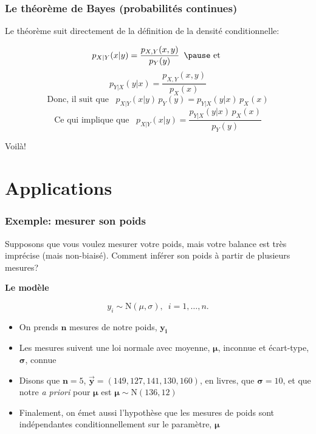 \documentclass{beamer}
\begin{document}
\begin{frame}
    \frametitle{Le théorème de Bayes (probabilités continues)}
    Le théorème suit directement de la définition de la densité conditionnelle:

    \pause

    \[p_{X|Y}(x|y) = \frac{p_{X,Y}(x,y)}{p_Y(y)} \,\,\, \pause \textrm{ et }\]
    \[p_{Y|X}(y|x) = \frac{p_{X,Y}(x,y)}{p_X(x)}\]
    \pause
    \[\textrm{Donc, il suit que } \,\,\, p_{X|Y}(x|y) \, p_Y(y) = p_{Y|X}(y|x) \, p_X(x)\]
    \pause
    \[\textrm{Ce qui implique que } \,\,\, p_{X|Y}(x|y) = \frac{p_{Y|X}(y|x) \, p_X(x)}{p_Y(y)}\]

    Voilà!
\end{frame}



\section{Applications}

\begin{frame}
    \frametitle{Exemple: mesurer son poids}
    Supposons que vous voulez mesurer votre poids, mais votre balance
    est très imprécise (mais non-biaisé). Comment inférer son poids à partir de plusieurs mesures?

    \pause

    \vfill

    \textbf{Le modèle}

    \[y_i \sim \textrm{N}(\mu, \sigma), \, \, \, i = 1, \ldots, n.\]

    \pause

    \begin{itemize}
      \item On prends $\boldsymbol{n}$ mesures de notre poids, $\boldsymbol{y_i}$
      \pause
      \item Les mesures suivent une loi normale avec moyenne, $\boldsymbol{\mu}$,
            inconnue et écart-type, $\boldsymbol{\sigma}$, connue
      \pause
      \item Disons que $\boldsymbol{n} = 5$, $\boldsymbol{\vec{y}} = (149, 127, 141, 130, 160)$, en livres,
            que $\boldsymbol{\sigma} = 10$, et que notre \emph{a priori} pour $\boldsymbol{\mu}$
            est $\boldsymbol{\mu} \sim \textrm{N}(136, 12)$
      \pause
      \item Finalement, on émet aussi l'hypothèse que les mesures de poids sont indépendantes
            conditionnellement sur le paramètre, $\boldsymbol{\mu}$
    \end{itemize}
\end{frame}
\end{document}
